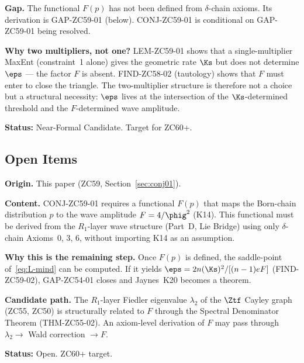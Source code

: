 \documentclass[12pt, a4paper]{article}
\begin{document}
\begin{derivedbox}[title={CONJ-ZC59-01: Two-Multiplier MaxEnt
  Derivation of $\eps$ (Near-Formal Candidate, $R_0$)}]
\textbf{Gap.}
The functional $F(p)$ has not been defined from $\delta$-chain
axioms.  Its derivation is GAP-ZC59-01 (below).  CONJ-ZC59-01
is conditional on GAP-ZC59-01 being resolved.

\textbf{Why two multipliers, not one?}
LEM-ZC59-01 shows that a single-multiplier MaxEnt (constraint~1
alone) gives the geometric rate $\Ks$ but does not determine
$\eps$ — the factor $F$ is absent.  FIND-ZC58-02 (tautology)
shows that $F$ must enter to close the triangle.
The two-multiplier structure is therefore not a choice but a
structural necessity: $\eps$ lives at the intersection of the
$\Ks$-determined threshold and the $F$-determined wave amplitude.

\textbf{Status:} Near-Formal Candidate.  Target for ZC60+.
\end{derivedbox}

\subsection{Open Items}
\label{sec:gaps}

\begin{openqbox}[title={GAP-ZC59-01: Wave-Amplitude Functional
  $F(p)$ from Axioms (Open)}]
\textbf{Origin.} This paper (ZC59, Section~\ref{sec:conj01}).

\textbf{Content.}
CONJ-ZC59-01 requires a functional $F(p)$ that maps the
Born-chain distribution $p$ to the wave amplitude
$F = 4/\phig^2$ (K14).  This functional must be derived from
the $R_1$-layer wave structure (Part~D, Lie Bridge) using only
$\delta$-chain Axioms~0, 3, 6, without importing K14 as an
assumption.

\textbf{Why this is the remaining step.}
Once $F(p)$ is defined, the saddle-point of~\eqref{eq:L-mind}
can be computed.  If it yields $\eps = 2n(\Ks)^2/[(n-1)eF]$
(FIND-ZC59-02), GAP-ZC54-01 closes and Jaynes~K20 becomes a
theorem.

\textbf{Candidate path.}
The $R_1$-layer Fiedler eigenvalue $\lambda_2$ of the $\Ztf$
Cayley graph (ZC55, ZC50) is structurally related to $F$
through the Spectral Denominator Theorem (THM-ZC55-02).
An axiom-level derivation of $F$ may pass through
$\lambda_2 \to$ Wald correction $\to F$.

\textbf{Status:} Open.  ZC60+ target.
\end{openqbox}
\end{document}

